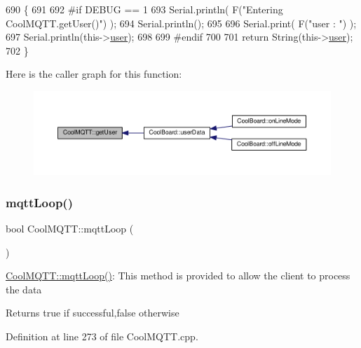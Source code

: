 \begin{DoxyCode}
690 \{
691 
692 \textcolor{preprocessor}{#if DEBUG == 1 }
693     Serial.println( F(\textcolor{stringliteral}{"Entering CoolMQTT.getUser()"}) );
694     Serial.println();
695     
696     Serial.print( F(\textcolor{stringliteral}{"user : "}) );
697     Serial.println(this->\hyperlink{class_cool_m_q_t_t_a8cd47e45d457f908d4b4390b35aaee83}{user});
698 
699 \textcolor{preprocessor}{#endif}
700 
701     \textcolor{keywordflow}{return} String(this->\hyperlink{class_cool_m_q_t_t_a8cd47e45d457f908d4b4390b35aaee83}{user});
702 \}
\end{DoxyCode}
Here is the caller graph for this function\+:\nopagebreak
\begin{figure}[H]
\begin{center}
\leavevmode
\includegraphics[width=350pt]{d0/dd0/class_cool_m_q_t_t_a373cc92fca7760d886f02d8a6e5b3f63_icgraph}
\end{center}
\end{figure}
\mbox{\label{class_cool_m_q_t_t_aa5eaae967b562b62cbcf2b8d81f6e5d5}} 
\subsubsection{\texorpdfstring{mqtt\+Loop()}{mqttLoop()}}
{\footnotesize\ttfamily bool Cool\+M\+Q\+T\+T\+::mqtt\+Loop (\begin{DoxyParamCaption}{ }\end{DoxyParamCaption})}

\hyperlink{class_cool_m_q_t_t_aa5eaae967b562b62cbcf2b8d81f6e5d5}{Cool\+M\+Q\+T\+T\+::mqtt\+Loop()}\+: This method is provided to allow the client to process the data

\begin{DoxyReturn}{Returns}
true if successful,false otherwise 
\end{DoxyReturn}


Definition at line 273 of file Cool\+M\+Q\+T\+T.\+cpp.


